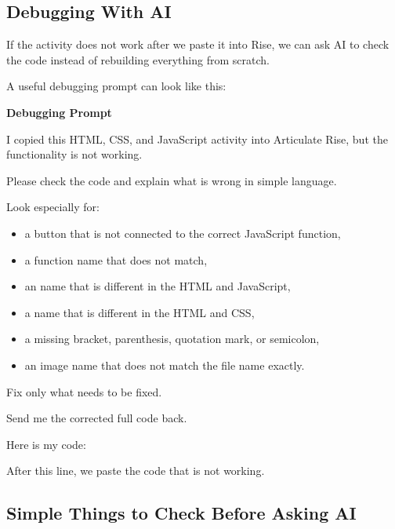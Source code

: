 \documentclass{article}
\begin{document}
\subsection*{\Bitter\textcolor{naranja}{Debugging With AI}}
\label{subsec:debugging-ai}

If the activity does not work after we paste it into Rise, we can ask AI to check the code instead of rebuilding everything from scratch.

A useful debugging prompt can look like this:

\begin{attentionbox}
  \textbf{\Bitter\textcolor{naranja}{Debugging Prompt}}

  I copied this HTML, CSS, and JavaScript activity into Articulate Rise, but the functionality is not working.

  Please check the code and explain what is wrong in simple language.

  Look especially for:

  \begin{itemize}[leftmargin=1.2cm, itemsep=3pt]
    \item a button that is not connected to the correct JavaScript function,
    \item a function name that does not match,
    \item an  name that is different in the HTML and JavaScript,
    \item a  name that is different in the HTML and CSS,
    \item a missing bracket, parenthesis, quotation mark, or semicolon,
    \item an image name that does not match the file name exactly.
  \end{itemize}

  Fix only what needs to be fixed.

  Send me the corrected full code back.

  Here is my code:
\end{attentionbox}

\vspace{0.3cm}

After this line, we paste the code that is not working.

\vspace{0.3cm}

\subsection*{\Bitter\textcolor{naranja}{Simple Things to Check Before Asking AI}}
\label{subsec:simple-checks-before-ai}
\end{document}
